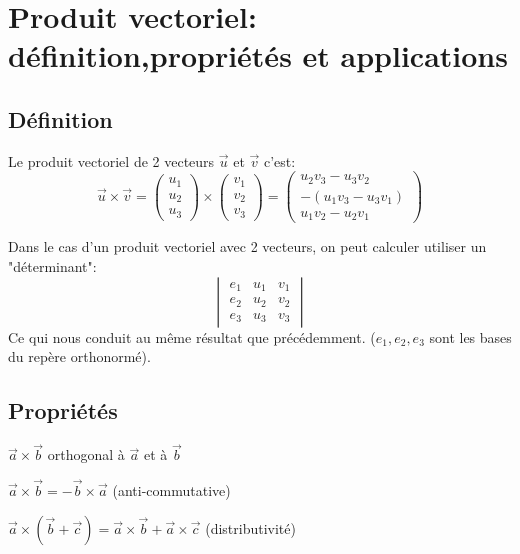 \documentclass[12pt,a4paper]{report}
\begin{document}
	\chapter[Géométrie de l'espace]{Produit vectoriel: définition,propriétés et applications}
	\section*{Définition}
	\vspace{10cm}
	Le produit vectoriel de 2 vecteurs $\overrightarrow{u}$ et $\overrightarrow{v}$ c'est: \[ \overrightarrow{u}\times\overrightarrow{v}=\left( \begin{array}{c}
	u_1 \\
	u_2 \\
	u_3
	\end{array} \right) \times \left( \begin{array}{c}
	v_1 \\
	v_2 \\
	v_3
	\end{array} \right) = \left( \begin{array}{c}
	u_2v_3-u_3v_2 \\
	-(u_1v_3-u_3v_1) \\
	u_1v_2-u_2v_1
	\end{array} \right) \]
	
	Dans le cas d'un produit vectoriel avec 2 vecteurs, on peut calculer utiliser un "déterminant":
	\[\begin{vmatrix}
	e_1 & u_1 & v_1 \\
	e_2 & u_2 & v_2 \\
	e_3 & u_3 & v_3 
	\end{vmatrix}\] 
	Ce qui nous conduit au même résultat que précédemment. ($e_1,e_2,e_3$ sont les bases du repère orthonormé).
	\section*{Propriétés}
	
	$\overrightarrow{a}\times\overrightarrow{b}$ orthogonal à $\overrightarrow{a}$ et à $\overrightarrow{b}$
	\smallskip
	
	$\overrightarrow{a}\times\overrightarrow{b}=-\overrightarrow{b}\times\overrightarrow{a}$ (anti-commutative)
	\smallskip
	
	$\overrightarrow{a}\times(\overrightarrow{b}+\overrightarrow{c})=\overrightarrow{a}\times\overrightarrow{b}+\overrightarrow{a}\times\overrightarrow{c}$ (distributivité)
	\smallskip
	
\end{document}
